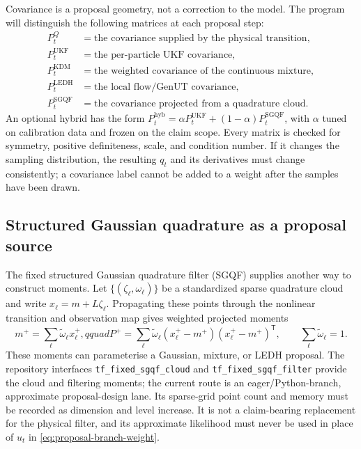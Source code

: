 \documentclass[11pt]{article}
\begin{document}
Covariance is a proposal geometry, not a correction to the model. The program
will distinguish the following matrices at each proposal step:
\begin{align}
 P_t^{Q}&=\text{the covariance supplied by the physical transition},\\
 P_t^{\mathrm{UKF}}&=\text{the per-particle UKF covariance},\\
 P_t^{\mathrm{KDM}}&=\text{the weighted covariance of the continuous mixture},\\
 P_t^{\mathrm{LEDH}}&=\text{the local flow/GenUT covariance},\\
 P_t^{\mathrm{SGQF}}&=\text{the covariance projected from a quadrature cloud}.
\end{align}
An optional hybrid has the form
$P_t^{\mathrm{hyb}}=\alpha P_t^{\mathrm{UKF}}+(1-\alpha)P_t^{\mathrm{SGQF}}$,
with $\alpha$ tuned on calibration data and frozen on the claim scope. Every
matrix is checked for symmetry, positive definiteness, scale, and condition
number. If it changes the sampling distribution, the resulting $q_t$ and its
derivatives must change consistently; a covariance label cannot be added to a
weight after the samples have been drawn.

\subsection{Structured Gaussian quadrature as a proposal source}

The fixed structured Gaussian quadrature filter (SGQF) supplies another way to
construct moments. Let $\{(\zeta_\ell,\omega_\ell)\}$ be a standardized sparse
quadrature cloud and write $x_\ell=m+L\zeta_\ell$. Propagating these points
through the nonlinear transition and observation map gives weighted projected
moments
\begin{equation}
 m^+=\sum_\ell \widetilde\omega_\ell x_\ell^+,qquad
 P^+=\sum_\ell \widetilde\omega_\ell
       (x_\ell^+-m^+)(x_\ell^+-m^+)^\mathsf T,
 \qquad \sum_\ell\widetilde\omega_\ell=1.       \label{eq:sgqf-moments}
\end{equation}
These moments can parameterise a Gaussian, mixture, or LEDH proposal. The
repository interfaces \texttt{tf\_fixed\_sgqf\_cloud} and
\texttt{tf\_fixed\_sgqf\_filter} provide the cloud and filtering moments; the
current route is an eager/Python-branch, approximate proposal-design lane.
Its sparse-grid point count and memory must be recorded as dimension and level
increase. It is not a claim-bearing replacement for the physical filter, and
its approximate likelihood must never be used in place of $u_t$ in
\eqref{eq:proposal-branch-weight}.
\end{document}
